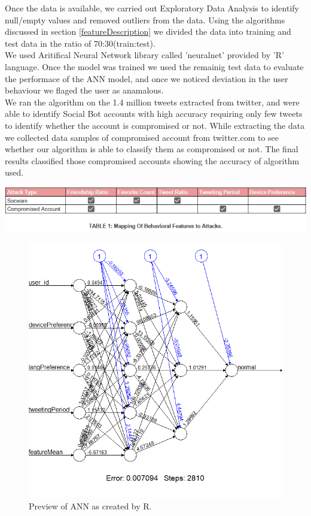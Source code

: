 \documentclass[conference]{IEEEtran}
\begin{document}
  	Once the data is available, we carried out Exploratory Data Analysis to identify null/empty values and removed outliers from the data. Using the algorithms discussed in section \ref{featureDescription} we divided the data into training and test data in the ratio of 70:30(train:test). \\

	We used Aritifical Neural Network library called 'neuralnet' provided by 'R' language. Once the model was trained we used the remainig test data to evaluate the performace of the ANN model, and once we noticed deviation in the user behaviour we flaged the user as anamalous. \\
	
	We ran the algorithm on the 1.4 million tweets extracted from twitter, and were able to identify Social Bot accounts with high accuracy requiring only few tweets to identify whether the account is compromised or not.
 While extracting the data we collected data samples of compromised account from twitter.com to see whether our algorithm is able to classify them as compromised or not. The final results classified those compromised accounts showing the accuracy of algorithm used.


\newpage
\includegraphics[scale=0.9]{attack_types}


\begin{figure}[h!]
  \includegraphics[scale=0.4]{sample_ann}
  \caption{Preview of ANN as created by R.}
\end{figure}
\end{document}

